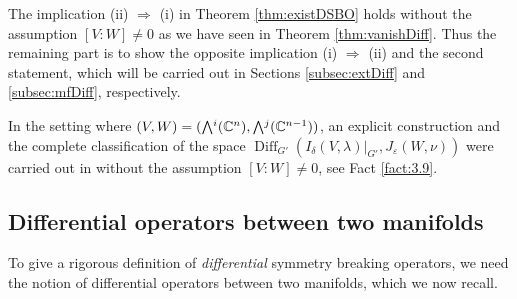 The implication (ii) $\Rightarrow$ (i) in Theorem \ref{thm:existDSBO}
 holds without the assumption $[V:W] \ne 0$
 as we have seen in Theorem \ref{thm:vanishDiff}.  
Thus the remaining part is to show the opposite implication (i) $\Rightarrow$ (ii)
 and the second statement, 
 which will be carried out
 in Sections \ref{subsec:extDiff} and \ref{subsec:mfDiff}, 
 respectively.  



\begin{remark}
In the setting
 where $(V,W)=(\Exterior^i({\mathbb{C}}^n), \Exterior^j({\mathbb{C}}^{n-1}))$, 
 an explicit construction
 and the complete classification
 of the space
$
  {\operatorname{Diff}}_{G'}
  (I_{\delta}(V,\lambda)|_{G'},J_{\varepsilon}(W,\nu))
$
 were carried out in \cite{KKP}
 without the assumption $[V:W] \ne 0$, 
 see Fact \ref{fact:3.9}.   
\end{remark}

\subsection{Differential operators between two manifolds}
\label{subsec:diff}

To give a rigorous definition 
 of 
{\it{differential}} symmetry breaking operators,
 we need the notion of differential operators
 between two manifolds, 
 which we now recall.  



